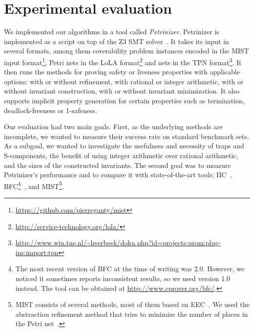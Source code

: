 \chapter{Experimental evaluation}
\label{chap:experimental_evaluation}

We implemented our algorithms in a tool called
\emph{Pe\-tri\-ni\-zer}. 
Petrinizer is implemented as a script
on top of the Z3 SMT solver~\cite{MouraB08}.
It takes its input in several formats, among them
coverability problem instances encoded in the MIST
input format\footnote{\url{https://github.com/pierreganty/mist}},
Petri nets in the
LoLA format\footnote{\url{http://service-technology.org/lola/}} and
nets in the TPN format\footnote{\url{http://www.win.tue.nl/~hverbeek/doku.php?id=projects:prom:plug-ins:import:tpn}}.
It then runs the methods for proving safety or liveness properties
with applicable options:
with or without refinement, with rational or integer arithmetic,
with or without invariant construction, with or without invariant
minimization. It also supports implicit property generation for
certain properties such as termination, deadlock-freeness or 1-safeness.

Our evaluation had two main goals. First, as the underlying
methods are incomplete, we wanted to measure their success rate on standard
benchmark sets.
As a subgoal, we wanted to investigate
the usefulness and necessity of traps and S-components,
the benefit of using integer arithmetic
over rational arithmetic, and the sizes of the constructed invariants.
The second goal was to measure Petrinizer's performance and to compare it
with state-of-the-art tools:
IIC~\cite{KloosMNP13}, BFC\footnote{The most recent version of BFC at the time of
writing was 2.0. However, we noticed it sometimes reports
inconsistent results, so we used version 1.0 instead. The tool can be
obtained at \url{http://www.cprover.org/bfc/}.}~\cite{KaiserKW12}, and
MIST\footnote{MIST consists of several methods, most of them based on
  EEC~\cite{GeeraertsRB06}. We used the abstraction
  refinement method that tries to minimize the number of places in the
  Petri net~\cite{GantyRB08}.}.


